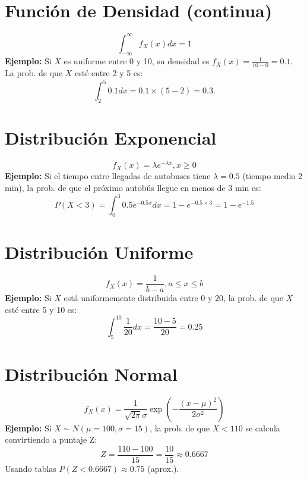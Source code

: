 \documentclass[10pt]{article}
\begin{document}
\begin{multicols}{2}
		\section*{Función de Densidad (continua)}
		\[
		\int_{-\infty}^{\infty} f_X(x)dx=1
		\]
		\textbf{Ejemplo:}  
		Si $X$ es uniforme entre 0 y 10, su densidad es $f_X(x)=\frac{1}{10-0}=0.1$. La prob. de que $X$ esté entre 2 y 5 es:
		\[
		\int_2^5 0.1 dx = 0.1 \times (5-2)=0.3.
		\]
		
		\section*{Distribución Exponencial}
		\[
		f_X(x)=\lambda e^{-\lambda x}, x\ge0
		\]
		\textbf{Ejemplo:}  
		Si el tiempo entre llegadas de autobuses tiene $\lambda=0.5$ (tiempo medio 2 min), la prob. de que el próximo autobús llegue en menos de 3 min es:
		\[
		P(X<3)=\int_0^3 0.5 e^{-0.5x}dx=1-e^{-0.5\times3}=1-e^{-1.5}
		\]
		
		\section*{Distribución Uniforme}
		\[
		f_X(x)=\frac{1}{b-a}, a\le x\le b
		\]
		\textbf{Ejemplo:}  
		Si $X$ está uniformemente distribuida entre 0 y 20, la prob. de que $X$ esté entre 5 y 10 es:
		\[
		\int_5^{10}\frac{1}{20}dx=\frac{10-5}{20}=0.25
		\]
		
		\section*{Distribución Normal}
		\[
		f_X(x)=\frac{1}{\sqrt{2\pi}\sigma}\exp\left(-\frac{(x-\mu)^2}{2\sigma^2}\right)
		\]
		\textbf{Ejemplo:}  
		Si $X\sim N(\mu=100,\sigma=15)$, la prob. de que $X<110$ se calcula convirtiendo a puntaje Z:  
		\[
		Z=\frac{110-100}{15}=\frac{10}{15}\approx0.6667
		\]
		Usando tablas $P(Z<0.6667)\approx0.75$ (aprox.).
		
	\end{multicols}

	
	
\end{document}
